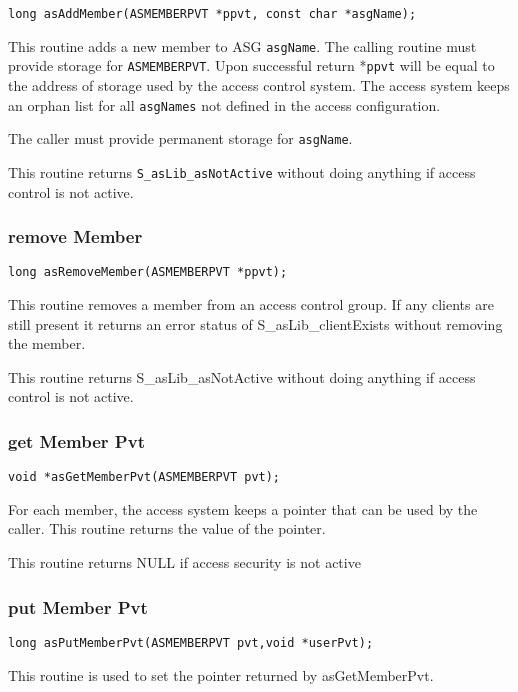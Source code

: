 \begin{verbatim}long asAddMember(ASMEMBERPVT *ppvt, const char *asgName);
\end{verbatim}This routine adds a new member to ASG \verb|asgName|. The calling routine must provide storage for \verb|ASMEMBERPVT|. Upon 
successful return *\verb|ppvt| will be equal to the address of storage used by the access control system. The access system 
keeps an orphan list for all \verb|asgNames| not defined in the access configuration.

The caller must provide permanent storage for \verb|asgName|.

This routine returns \verb|S_asLib_asNotActive| without doing anything if access control is not active.

\subsubsection{remove Member}

\begin{verbatim}long asRemoveMember(ASMEMBERPVT *ppvt);
\end{verbatim}This routine removes a member from an access control group. If any clients are still present it returns an error status of 
S\_asLib\_clientExists without removing the member.

This routine returns S\_asLib\_asNotActive without doing anything if access control is not active.

\subsubsection{get Member Pvt}

\begin{verbatim}void *asGetMemberPvt(ASMEMBERPVT pvt);
\end{verbatim}For each member, the access system keeps a pointer that can be used by the caller. This routine returns the value of the 
pointer.

This routine returns NULL if access security is not active 

\subsubsection{put Member Pvt}

\begin{verbatim}long asPutMemberPvt(ASMEMBERPVT pvt,void *userPvt);
\end{verbatim}This routine is used to set the pointer returned by asGetMemberPvt.

